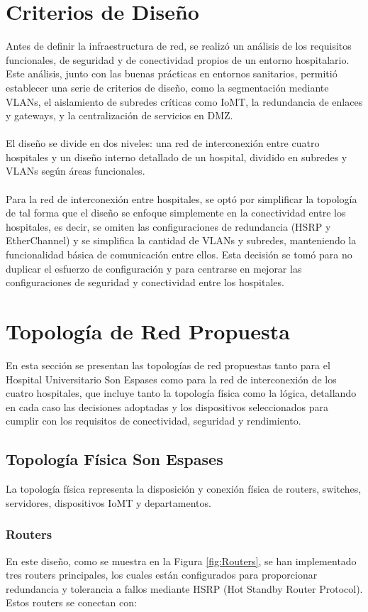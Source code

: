 \section{Criterios de Diseño}
\label{sec:criterios}
Antes de definir la infraestructura de red, se realizó un análisis de los requisitos funcionales, de seguridad y de conectividad propios de un entorno hospitalario. Este 
análisis, junto con las buenas prácticas en entornos sanitarios, permitió establecer una serie de criterios de diseño, como la segmentación mediante VLANs, el aislamiento 
de subredes críticas como IoMT, la redundancia de enlaces y gateways, y la centralización de servicios en DMZ.
\\ \\
El diseño se divide en dos niveles: una red de interconexión entre cuatro hospitales y un diseño interno detallado de un hospital, dividido en subredes y VLANs según áreas funcionales.
\\  \\
Para la red de interconexión entre hospitales, se optó por simplificar la topología de tal forma que el diseño se enfoque simplemente en la conectividad entre los hospitales, es decir,
se omiten las configuraciones de redundancia (HSRP y EtherChannel) y se simplifica la cantidad de VLANs y subredes, manteniendo la funcionalidad básica de comunicación entre ellos. Esta decisión se tomó 
para no duplicar el esfuerzo de configuración y para centrarse en mejorar las configuraciones de seguridad y conectividad entre los hospitales. 

\section{Topología de Red Propuesta}
En esta sección se presentan las topologías de red propuestas tanto para el Hospital Universitario Son Espases como para la red de interconexión de los cuatro hospitales, que incluye tanto la topología física como la lógica, detallando en cada caso las decisiones adoptadas
y los dispositivos seleccionados para cumplir con los requisitos de conectividad, seguridad y rendimiento.

\subsection{Topología Física Son Espases}
La topología física representa la disposición y conexión física de routers, switches, servidores, dispositivos IoMT y departamentos.
\subsubsection{Routers}
En este diseño, como se muestra en la Figura \ref{fig:Routers}, se han implementado tres routers principales, los cuales están configurados para proporcionar 
redundancia y tolerancia a fallos mediante HSRP (Hot Standby Router Protocol). Estos routers se conectan con:

